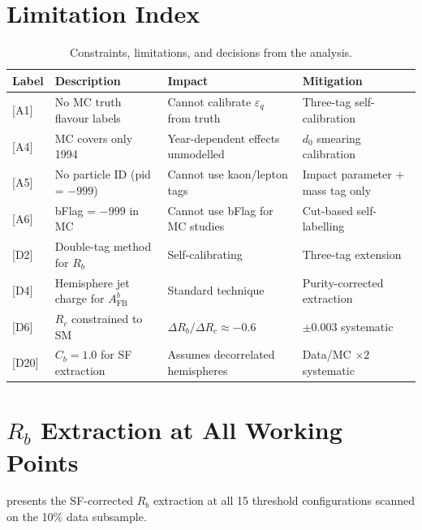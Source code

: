 \documentclass[11pt,a4paper]{article}
\begin{document}
\section{Limitation Index}
\label{app:limitation-index}

\begin{table}[htbp]
\centering
\caption{Constraints, limitations, and decisions from the analysis.}
\label{tbl:limitation_index}
\begin{tabular}{p{1.5cm}p{6cm}p{3cm}p{4cm}}
\toprule
Label & Description & Impact & Mitigation \\
\midrule
{[A1]} & No MC truth flavour labels &
  Cannot calibrate $\varepsilon_q$ from truth &
  Three-tag self-calibration \\
{[A4]} & MC covers only 1994 &
  Year-dependent effects unmodelled &
  $d_0$ smearing calibration \\
{[A5]} & No particle ID (pid = $-999$) &
  Cannot use kaon/lepton tags &
  Impact parameter + mass tag only \\
{[A6]} & bFlag = $-999$ in MC &
  Cannot use bFlag for MC studies &
  Cut-based self-labelling \\
{[D2]} & Double-tag method for $R_b$ &
  Self-calibrating &
  Three-tag extension \\
{[D4]} & Hemisphere jet charge for $A_\text{FB}^b$ &
  Standard technique &
  Purity-corrected extraction \\
{[D6]} & $R_c$ constrained to SM &
  $\Delta R_b/\Delta R_c \approx -0.6$ &
  $\pm 0.003$ systematic \\
{[D20]} & $C_b = 1.0$ for SF extraction &
  Assumes decorrelated hemispheres &
  Data/MC $\times 2$ systematic \\
\bottomrule
\end{tabular}
\end{table}

\section{$R_b$ Extraction at All Working Points}
\label{app:rb_all_wp}

 presents the SF-corrected $R_b$ extraction
at all 15 threshold configurations scanned on the 10\% data
subsample.
\end{document}
